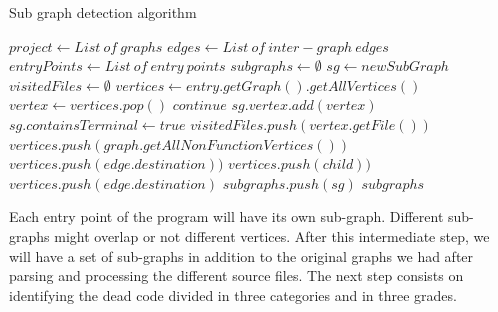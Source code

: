\documentclass{uvamscse}
\begin{document}
\begin{algorithm}[H]
\caption{Sub graph detection algorithm}
\begin{algorithmic}[1]
\STATE {}
\STATE $project \gets List\ of\ graphs$
\STATE $edges \gets List\ of\ inter-graph\ edges$
\STATE $entryPoints \gets List\ of\ entry\ points$
\STATE
\STATE {}
\STATE $subgraphs \gets \emptyset$
    \STATE $sg \gets new SubGraph$
    \STATE $visitedFiles \gets \emptyset$
    \STATE $vertices \gets entry.getGraph().getAllVertices()$
        \STATE $vertex \gets vertices.pop()$
            \STATE $continue$
        \ELSE
            \STATE $sg.vertex.add(vertex)$
        \ENDIF
            \STATE $sg.containsTerminal \gets true$
        \ENDIF
            \STATE $visitedFiles.push(vertex.getFile())$
            \STATE $vertices.push(graph.getAllNonFunctionVertices())$
        \ENDIF
            \STATE $vertices.push(edge.destination))$
        \ENDFOR
                \STATE $vertices.push(child))$
            \ENDIF
        \ENDFOR
                \STATE $vertices.push(edge.destination)$
            \ENDIF
        \ENDFOR
    \ENDWHILE
    \STATE $subgraphs.push(sg)$
\ENDFOR
\RETURN $subgraphs$
\end{algorithmic}
\end{algorithm}

Each entry point of the program will have its own sub-graph. Different sub-graphs might overlap or not different vertices. After this intermediate step, we will have a set of sub-graphs in addition to the original graphs we had after parsing and processing the different source files. The next step consists on identifying the dead code divided in three categories and in three grades.
\end{document}
